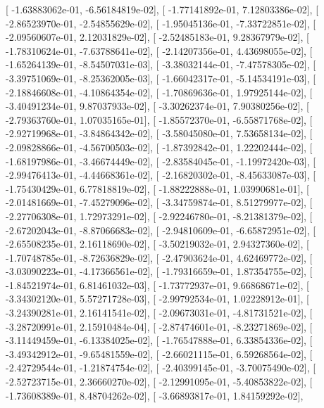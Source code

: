 \documentclass{article}
\begin{document}
       [ -1.63883062e-01,  -6.56184819e-02],
       [ -1.77141892e-01,   7.12803386e-02],
       [ -2.86523970e-01,  -2.54855629e-02],
       [ -1.95045136e-01,  -7.33722851e-02],
       [ -2.09560607e-01,   2.12031829e-02],
       [ -2.52485183e-01,   9.28367979e-02],
       [ -1.78310624e-01,  -7.63788641e-02],
       [ -2.14207356e-01,   4.43698055e-02],
       [ -1.65264139e-01,  -8.54507031e-03],
       [ -3.38032144e-01,  -7.47578305e-02],
       [ -3.39751069e-01,  -8.25362005e-03],
       [ -1.66042317e-01,  -5.14534191e-03],
       [ -2.18846608e-01,  -4.10864354e-02],
       [ -1.70869636e-01,   1.97925144e-02],
       [ -3.40491234e-01,   9.87037933e-02],
       [ -3.30262374e-01,   7.90380256e-02],
       [ -2.79363760e-01,   1.07035165e-01],
       [ -1.85572370e-01,  -6.55871768e-02],
       [ -2.92719968e-01,  -3.84864342e-02],
       [ -3.58045080e-01,   7.53658134e-02],
       [ -2.09828866e-01,  -4.56700503e-02],
       [ -1.87392842e-01,   1.22202444e-02],
       [ -1.68197986e-01,  -3.46674449e-02],
       [ -2.83584045e-01,  -1.19972420e-03],
       [ -2.99476413e-01,  -4.44668361e-02],
       [ -2.16820302e-01,  -8.45633087e-03],
       [ -1.75430429e-01,   6.77818819e-02],
       [ -1.88222888e-01,   1.03990681e-01],
       [ -2.01481669e-01,  -7.45279096e-02],
       [ -3.34759874e-01,   8.51279977e-02],
       [ -2.27706308e-01,   1.72973291e-02],
       [ -2.92246780e-01,  -8.21381379e-02],
       [ -2.67202043e-01,  -8.87066683e-02],
       [ -2.94810609e-01,  -6.65872951e-02],
       [ -2.65508235e-01,   2.16118690e-02],
       [ -3.50219032e-01,   2.94327360e-02],
       [ -1.70748785e-01,  -8.72636829e-02],
       [ -2.47903624e-01,   4.62469772e-02],
       [ -3.03090223e-01,  -4.17366561e-02],
       [ -1.79316659e-01,   1.87354755e-02],
       [ -1.84521974e-01,   6.81461032e-03],
       [ -1.73772937e-01,   9.66868671e-02],
       [ -3.34302120e-01,   5.57271728e-03],
       [ -2.99792534e-01,   1.02228912e-01],
       [ -3.24390281e-01,   2.16141541e-02],
       [ -2.09673031e-01,  -4.81731521e-02],
       [ -3.28720991e-01,   2.15910484e-04],
       [ -2.87474601e-01,  -8.23271869e-02],
       [ -3.11449459e-01,  -6.13384025e-02],
       [ -1.76547888e-01,   6.33854336e-02],
       [ -3.49342912e-01,  -9.65481559e-02],
       [ -2.66021115e-01,   6.59268564e-02],
       [ -2.42729544e-01,  -1.21874754e-02],
       [ -2.40399145e-01,  -3.70075490e-02],
       [ -2.52723715e-01,   2.36660270e-02],
       [ -2.12991095e-01,  -5.40853822e-02],
       [ -1.73608389e-01,   8.48704262e-02],
       [ -3.66893817e-01,   1.84159292e-02],
\end{document}
